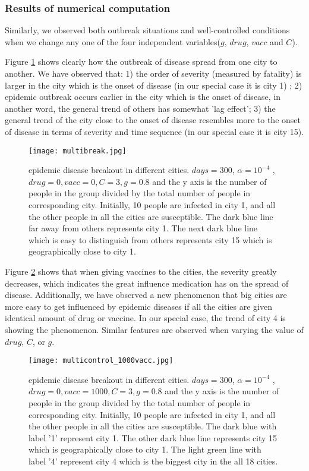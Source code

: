 \subsubsection{Results of numerical computation}
Similarly, we observed both outbreak situations and well-controlled conditions when we change any one of the four independent variables($g$, $drug$, $vacc$ and $C$).

Figure \ref{multibreak} shows clearly how the outbreak of disease spread from one city to another. We have observed that: 1) the order of severity (measured by fatality) is larger in the city which is the onset of disease (in our special case it is city 1) ; 2) epidemic outbreak occurs earlier in the city which is the onset of disease, in another word, the general trend of others has somewhat 'lag effect'; 3) the general trend of the city close to the onset of disease resembles more to the onset of disease in terms of severity and time sequence (in our special case it is city 15).

\begin{figure}
	\centering
	\texttt{[image: multibreak.jpg]}
	\caption{epidemic disease breakout in different cities. $days = 300$, $\alpha = 10^{-4}$ , $drug = 0, vacc = 0, C = 3, g = 0.8$ and the y axis is the number of people in the group divided by the total number of people in corresponding city. Initially, 10 people are infected in city 1, and all the other people in all the cities are susceptible. The dark blue line far away from others represents city 1. The next dark blue line which is easy to distinguish from others represents city 15 which is geographically close to city 1.}
	\label{multibreak}
\end{figure}

Figure \ref{multicontrol_1000vacc} shows that when giving vaccines to the cities, the severity greatly decreases, which indicates the great influence medication has on the spread of disease. Additionally, we have observed a new phenomenon that big cities are more easy to get influenced by epidemic diseases if all the cities are given identical amount of drug or vaccine. In our special case, the trend of city 4 is showing the phenomenon. Similar features are observed when varying the value of $drug$, $C$, or $g$.

\begin{figure}
	\centering
	\texttt{[image: multicontrol\_1000vacc.jpg]}
	\caption{epidemic disease breakout in different cities. $days = 300$, $\alpha = 10^{-4}$ , $drug = 0, vacc = 1000, C = 3, g = 0.8$ and the y axis is the number of people in the group divided by the total number of people in corresponding city. Initially, 10 people are infected in city 1, and all the other people in all the cities are susceptible. The dark blue with label '1' represent city 1. The other dark blue line represents city 15 which is geographically close to city 1. The light green line with label '4' represent city 4 which is the biggest city in the all 18 cities.}
	\label{multicontrol_1000vacc}
\end{figure}

